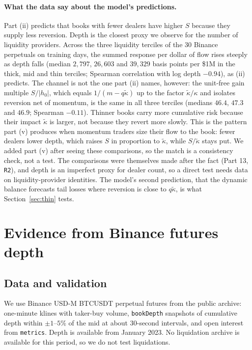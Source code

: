 \documentclass[12pt]{article}
\theoremstyle{definition}
\theoremstyle{remark}
\begin{document}
\paragraph{What the data say about the model's predictions.} Part (ii) predicts that books with fewer dealers have higher $S$ because they supply less reversion. Depth is the closest proxy we observe for the number of liquidity providers. Across the three liquidity terciles of the 30 Binance perpetuals on training days, the summed response per dollar of flow rises steeply as depth falls (median $2{,}797$, $26{,}603$ and $39{,}329$ basis points per \$1M in the thick, mid and thin terciles; Spearman correlation with log depth $-0.94$), as (ii) predicts. The channel is not the one part (ii) names, however: the unit-free gain multiple $S/|h_0|$, which equals $1/(m-q\tilde\kappa)$ up to the factor $\tilde\kappa/\kappa$ and isolates reversion net of momentum, is the same in all three terciles (medians $46.4$, $47.3$ and $46.9$; Spearman $-0.11$). Thinner books carry more cumulative risk because their impact $\tilde\kappa$ is larger, not because they revert more slowly. This is the pattern part (v) produces when momentum traders size their flow to the book: fewer dealers lower depth, which raises $S$ in proportion to $\tilde\kappa$, while $S/\tilde\kappa$ stays put. We added part (v) after seeing these comparisons, so the match is a consistency check, not a test. The comparisons were themselves made after the fact (Part 13, \texttt{R2}), and depth is an imperfect proxy for dealer count, so a direct test needs data on liquidity-provider identities. The model's second prediction, that the dynamic balance forecasts tail losses where reversion is close to $q\tilde\kappa$, is what Section~\ref{sec:thin} tests.
\section{Evidence from Binance futures depth}\label{sec:depth}

\subsection{Data and validation}
We use Binance USD-M BTCUSDT perpetual futures from the public archive: one-minute klines with taker-buy volume, \texttt{bookDepth} snapshots of cumulative depth within $\pm1$--$5\%$ of the mid at about 30-second intervals, and open interest from \texttt{metrics}. Depth is available from January 2023. No liquidation archive is available for this period, so we do not test liquidations.
\end{document}
